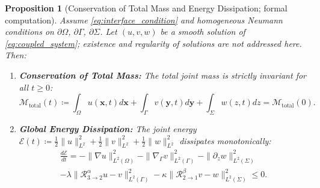 \documentclass[11pt,a4paper]{article}
\theoremstyle{plain}
\newtheorem{proposition}[theorem]{Proposition}
\theoremstyle{definition}
\theoremstyle{remark}
\numberwithin{equation}{section}
\begin{document}
\begin{proposition}[Conservation of Total Mass and Energy Dissipation; formal computation]
\label{prop:coupled_conservation}
Assume \eqref{eq:interface_condition} and homogeneous Neumann conditions on $\partial\Omega$, $\partial\Gamma$, $\partial\Sigma$. Let $(u, v, w)$ be a smooth solution of \eqref{eq:coupled_system}; existence and regularity of solutions are not addressed here. Then:
\begin{enumerate}
    \item \textbf{Conservation of Total Mass:} The total joint mass is strictly invariant for all $t \ge 0$:
    \begin{equation}
    \mathcal{M}_{\text{total}}(t) \coloneqq \int_\Omega u(\mathbf{x}, t)d\mathbf{x} + \int_\Gamma v(\mathbf{y}, t)d\mathbf{y} + \int_\Sigma w(z, t)dz = \mathcal{M}_{\text{total}}(0).
    \end{equation}
    \item \textbf{Global Energy Dissipation:} The joint energy $\mathcal{E}(t) \coloneqq \frac{1}{2}\|u\|_{L^2}^2 + \frac{1}{2}\|v\|_{L^2}^2 + \frac{1}{2}\|w\|_{L^2}^2$ dissipates monotonically:
    \begin{multline}
    \frac{d\mathcal{E}}{dt} = -\|\nabla u\|_{L^2(\Omega)}^2 - \|\nabla_\Gamma v\|_{L^2(\Gamma)}^2 - \|\partial_z w\|_{L^2(\Sigma)}^2 \\
    - \lambda \|\mathcal{R}_{3 \to 2}^\alpha u - v\|_{L^2(\Gamma)}^2 - \kappa \|\mathcal{R}_{2 \to 1}^\beta v - w\|_{L^2(\Sigma)}^2 \le 0.
    \end{multline}
\end{enumerate}
\end{proposition}
\end{document}

